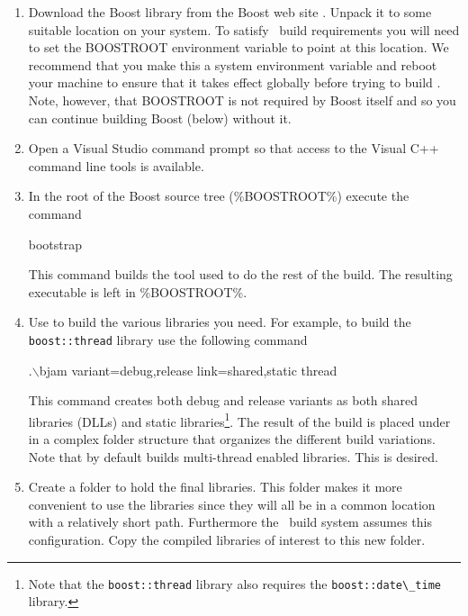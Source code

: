 \begin{enumerate}

\item Download the Boost library from the Boost web site \cite{boost}. Unpack it to some suitable location on your system. To satisfy \VTank\ build requirements you will need to set the BOOSTROOT environment variable to point at this location. We recommend that you make this a system environment variable and reboot your machine to ensure that it takes effect globally before trying to build \VTank. Note, however, that BOOSTROOT is not required by Boost itself and so you can continue building Boost (below) without it.

\item Open a Visual Studio command prompt so that access to the Visual C++ command line tools is available.

\item In the root of the Boost source tree (\%BOOSTROOT\%) execute the command
\begin{commands}
bootstrap
\end{commands}

This command builds the  tool used to do the rest of the build. The resulting executable  is left in \%BOOSTROOT\%.

\item Use  to build the various libraries you need. For example, to build the \lstinline!boost::thread! library use the following command
\begin{commands}
.$\backslash$bjam variant=debug,release link=shared,static thread
\end{commands}

This command creates both debug and release variants as both shared libraries (DLLs) and static libraries\footnote{Note that the \lstinline!boost::thread! library also requires the \lstinline!boost::date\_time! library.}. The result of the build is placed under  in a complex folder structure that organizes the different build variations. Note that by default  builds multi-thread enabled libraries. This is desired.

\item Create a folder  to hold the final libraries. This folder makes it more convenient to use the libraries since they will all be in a common location with a relatively short path. Furthermore the \VTank\ build system assumes this configuration. Copy the compiled libraries of interest to this new folder.

\end{enumerate}

